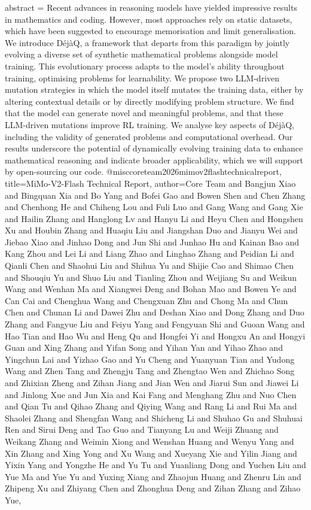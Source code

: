 {      abstract = {Recent advances in reasoning models have yielded impressive results in mathematics and coding. However, most approaches rely on static datasets, which have been suggested to encourage memorisation and limit generalisation. We introduce DéjàQ, a framework that departs from this paradigm by jointly evolving a diverse set of synthetic mathematical problems alongside model training. This evolutionary process adapts to the model's ability throughout training, optimising problems for learnability. We propose two LLM-driven mutation strategies in which the model itself mutates the training data, either by altering contextual details or by directly modifying problem structure. We find that the model can generate novel and meaningful problems, and that these LLM-driven mutations improve RL training. We analyse key aspects of DéjàQ, including the validity of generated problems and computational overhead. Our results underscore the potential of dynamically evolving training data to enhance mathematical reasoning and indicate broader applicability, which we will support by open-sourcing our code.}
}@misc{coreteam2026mimov2flashtechnicalreport,
      title={MiMo-V2-Flash Technical Report}, 
      author={Core Team and Bangjun Xiao and Bingquan Xia and Bo Yang and Bofei Gao and Bowen Shen and Chen Zhang and Chenhong He and Chiheng Lou and Fuli Luo and Gang Wang and Gang Xie and Hailin Zhang and Hanglong Lv and Hanyu Li and Heyu Chen and Hongshen Xu and Houbin Zhang and Huaqiu Liu and Jiangshan Duo and Jianyu Wei and Jiebao Xiao and Jinhao Dong and Jun Shi and Junhao Hu and Kainan Bao and Kang Zhou and Lei Li and Liang Zhao and Linghao Zhang and Peidian Li and Qianli Chen and Shaohui Liu and Shihua Yu and Shijie Cao and Shimao Chen and Shouqiu Yu and Shuo Liu and Tianling Zhou and Weijiang Su and Weikun Wang and Wenhan Ma and Xiangwei Deng and Bohan Mao and Bowen Ye and Can Cai and Chenghua Wang and Chengxuan Zhu and Chong Ma and Chun Chen and Chunan Li and Dawei Zhu and Deshan Xiao and Dong Zhang and Duo Zhang and Fangyue Liu and Feiyu Yang and Fengyuan Shi and Guoan Wang and Hao Tian and Hao Wu and Heng Qu and Hongfei Yi and Hongxu An and Hongyi Guan and Xing Zhang and Yifan Song and Yihan Yan and Yihao Zhao and Yingchun Lai and Yizhao Gao and Yu Cheng and Yuanyuan Tian and Yudong Wang and Zhen Tang and Zhengju Tang and Zhengtao Wen and Zhichao Song and Zhixian Zheng and Zihan Jiang and Jian Wen and Jiarui Sun and Jiawei Li and Jinlong Xue and Jun Xia and Kai Fang and Menghang Zhu and Nuo Chen and Qian Tu and Qihao Zhang and Qiying Wang and Rang Li and Rui Ma and Shaolei Zhang and Shengfan Wang and Shicheng Li and Shuhao Gu and Shuhuai Ren and Sirui Deng and Tao Guo and Tianyang Lu and Weiji Zhuang and Weikang Zhang and Weimin Xiong and Wenshan Huang and Wenyu Yang and Xin Zhang and Xing Yong and Xu Wang and Xueyang Xie and Yilin Jiang and Yixin Yang and Yongzhe He and Yu Tu and Yuanliang Dong and Yuchen Liu and Yue Ma and Yue Yu and Yuxing Xiang and Zhaojun Huang and Zhenru Lin and Zhipeng Xu and Zhiyang Chen and Zhonghua Deng and Zihan Zhang and Zihao Yue},
}
